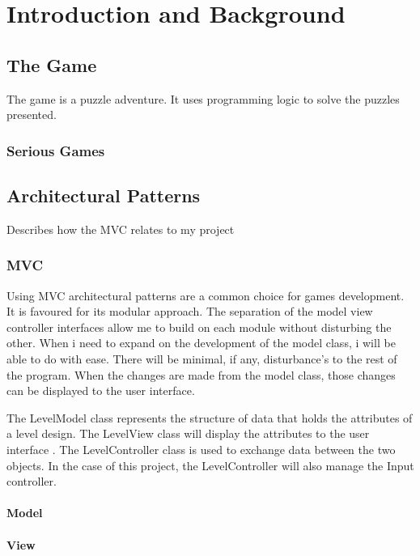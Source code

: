 
\chapter{Introduction and Background} \label{sec:introduction}

\section{The Game}

The game is a puzzle adventure. It uses programming logic to solve the puzzles presented. 

\subsection{Serious Games}


\section{Architectural Patterns}
Describes how the MVC relates to my project

\subsection{MVC}

Using MVC architectural patterns are a common choice for games development. It is favoured for its modular
 approach. The separation of the model view controller interfaces allow me to build on each module without disturbing the other. When i need to expand on the development of the model class, i will be able to do with ease. There will be minimal, if any, disturbance's to the rest of the program. When the changes are made from the model class, those changes can be displayed to the user interface.

The LevelModel class represents the structure of data that holds the attributes of a level design. The LevelView class will display the attributes to the user interface . The LevelController class is used to exchange data between the two objects. In the case of this project, the LevelController will also manage the Input controller. 


	
\subsubsection{Model}

\subsubsection{View}

